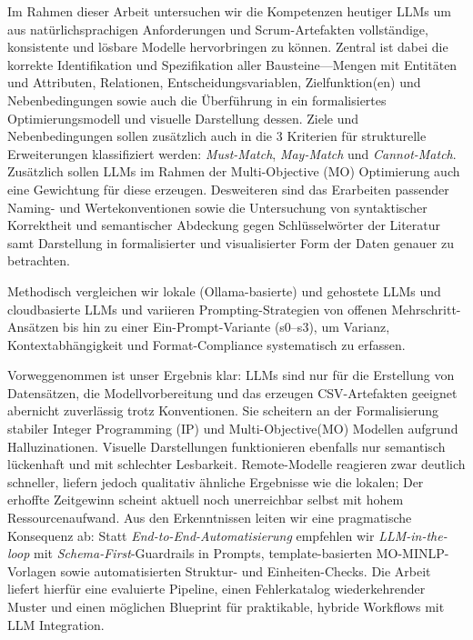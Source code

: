\documentclass[runningheads]{llncs}
\begin{document}
Im Rahmen dieser Arbeit untersuchen wir die Kompetenzen heutiger LLMs um aus natürlichsprachigen Anforderungen und Scrum-Artefakten vollständige, konsistente und lösbare Modelle hervorbringen zu können. 
Zentral ist dabei die korrekte Identifikation und Spezifikation aller Bausteine—Mengen mit Entitäten und Attributen, Relationen, Entscheidungsvariablen, Zielfunktion(en) und Nebenbedingungen sowie auch die Überführung in ein formalisiertes Optimierungsmodell und visuelle Darstellung dessen. Ziele und Nebenbedingungen sollen zusätzlich auch in die 3 Kriterien für strukturelle Erweiterungen klassifiziert werden: \emph{Must-Match}, \emph{May-Match} und \emph{Cannot-Match}. Zusätzlich sollen LLMs im Rahmen der Multi-Objective (MO) Optimierung auch eine Gewichtung für diese erzeugen. Desweiteren sind das Erarbeiten passender Naming- und Wertekonventionen sowie die Untersuchung von syntaktischer Korrektheit und semantischer Abdeckung gegen Schlüsselwörter der Literatur samt Darstellung in formalisierter und visualisierter Form der Daten genauer zu betrachten. 

Methodisch vergleichen wir lokale (Ollama-basierte) und gehostete LLMs und cloudbasierte LLMs und variieren Prompting-Strategien von offenen Mehrschritt-Ansätzen bis hin zu einer Ein-Prompt-Variante (s0–s3), um Varianz, Kontextabhängigkeit und Format-Compliance systematisch zu erfassen. 

Vorweggenommen ist unser Ergebnis klar: LLMs sind nur für die Erstellung von Datensätzen, die Modellvorbereitung und das erzeugen CSV-Artefakten geeignet abernicht zuverlässig trotz Konventionen. Sie scheitern an der Formalisierung stabiler Integer Programming (IP) und Multi-Objective(MO) Modellen aufgrund Halluzinationen. Visuelle Darstellungen funktionieren ebenfalls nur semantisch lückenhaft und mit schlechter Lesbarkeit. Remote-Modelle reagieren zwar deutlich schneller, liefern jedoch qualitativ ähnliche Ergebnisse wie die lokalen; Der erhoffte Zeitgewinn scheint aktuell noch unerreichbar selbst mit hohem Ressourcenaufwand. Aus den Erkenntnissen  leiten wir eine pragmatische Konsequenz ab: Statt \emph{End-to-End-Automatisierung} empfehlen wir \emph{LLM-in-the-loop} mit \emph{Schema-First}-Guardrails in Prompts, template-basierten MO-MINLP-Vorlagen sowie automatisierten Struktur- und Einheiten-Checks. Die Arbeit liefert hierfür eine evaluierte Pipeline, einen Fehlerkatalog wiederkehrender Muster und einen möglichen Blueprint für praktikable, hybride Workflows mit LLM Integration.

%
%
\end{document}
